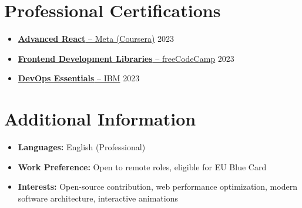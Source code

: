 \documentclass[11pt]{article}
\begin{document}
\section{Professional Certifications}
\begin{itemize}
\item \href{https://www.coursera.org/account/accomplishments/verify/QC73X86DWCRK}{\textbf{Advanced React} -- Meta (Coursera)} \hfill 2023
\item \href{https://www.freecodecamp.org/certification/fcc36860a3c-366f-4e05-8655-9eeeba048998/front-end-development-libraries}{\textbf{Frontend Development Libraries} -- freeCodeCamp} \hfill 2023
\item \href{https://www.credly.com/badges/41de71d0-506d-4fc4-98b8-3d72b7d4fd44/linked_in_profile}{\textbf{DevOps Essentials} -- IBM} \hfill 2023
\end{itemize}

\section{Additional Information}
\begin{itemize}
\item \textbf{Languages:} English (Professional)
\item \textbf{Work Preference:} Open to remote roles, eligible for EU Blue Card
\item \textbf{Interests:} Open-source contribution, web performance optimization, modern software architecture, interactive animations
\end{itemize}
\end{document}
